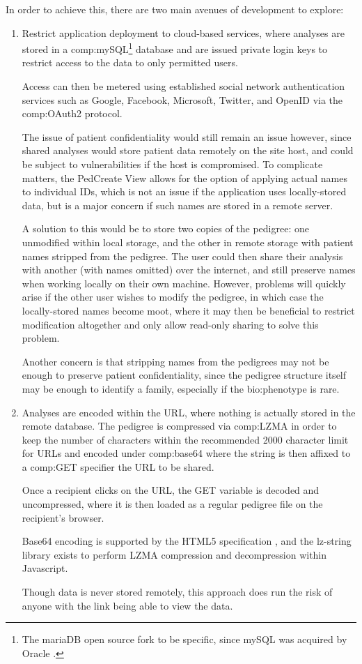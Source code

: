 In order to achieve this, there are two main avenues of development to explore:
\begin{enumerate}
\item{Restrict application deployment to cloud-based services, where analyses are stored in a \gls{comp:mySQL}\footnote{The mariaDB open source fork to be specific, since mySQL was acquired by Oracle \cite{oraclemysql}.} database and are issued private login keys to restrict access to the data to only permitted users.

Access can then be metered using established social network authentication services such as Google, Facebook, Microsoft, Twitter, and OpenID via the \gls{comp:OAuth2} \cite{hardt2012oauth} protocol.

The issue of patient confidentiality would still remain an issue however, since shared analyses would store patient data remotely on the site host, and could be subject to vulnerabilities if the host is compromised.  To complicate matters, the PedCreate View allows for the option of applying actual names to individual IDs, which is not an issue if the application uses locally-stored data, but is a major concern if such names are stored in a remote server.

A solution to this would be to store two copies of the pedigree: one unmodified within local storage, and the other in remote storage with patient names stripped from the pedigree. The user could then share their analysis with another (with names omitted) over the internet, and still preserve names when working locally on their own machine. However, problems will quickly arise if the other user wishes to modify the pedigree, in which case the locally-stored names become moot, where it may then be beneficial to restrict modification altogether and only allow read-only sharing to solve this problem.

Another concern is that stripping names from the pedigrees may not be enough to preserve patient confidentiality, since the pedigree structure itself may be enough to identify a family, especially if the \gls{bio:phenotype} is rare.
}
\item{Analyses are encoded within the URL, where nothing is actually stored in the remote database. The pedigree is compressed via \gls{comp:LZMA} \cite{lzma} in order to keep the number of characters within the recommended 2000 character limit for URLs \cite{urllength} and encoded under \gls{comp:base64} where the string is then affixed to a \gls{comp:GET} specifier the URL to be shared.

Once a recipient clicks on the URL, the GET variable is decoded and uncompressed, where it is then loaded as a regular pedigree file on the recipient's browser. 

Base64 encoding is supported by the HTML5 specification \cite{masinter1998data}, and the lz-string library exists \cite{lzstring} to perform LZMA compression and decompression within Javascript.

Though data is never stored remotely, this approach does run the risk of anyone with the link being able to view the data.
}
\end{enumerate}

